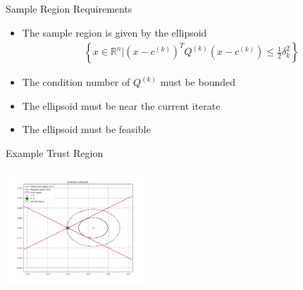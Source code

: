 \documentclass{beamer}
\newcommand{\Rn}{\mathbb R ^ {n}}
\begin{document}
\begin{frame}{Sample Region Requirements}
	\begin{itemize}
		\setlength\itemsep{1.5em}
		\item The sample region is given by the ellipsoid
\begin{align*}
\left\{x \in \Rn \bigg | \left(x - c^{(k)}\right)^TQ^{(k)}\left(x - c^{(k)}\right) \le \frac 1 2 \delta_k^2 \right\}
\end{align*}
		\item The condition number of $Q^{(k)}$ must be bounded
		\item The ellipsoid must be near the current iterate
		\item The ellipsoid must be feasible
	\end{itemize}
\end{frame}


\begin{frame}{Example Trust Region}
	\begin{center}
		\includegraphics[width=200px]{images/example_ellipsoid.png}
	\end{center}
\end{frame}
\end{document}
